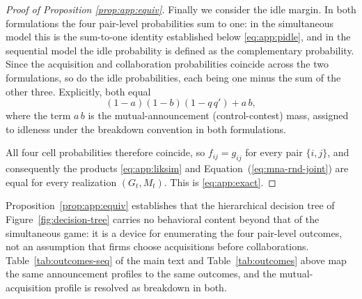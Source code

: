 \begin{proof}[Proof of Proposition \ref{prop:app:equiv}]
Finally we consider the idle margin. In both formulations the four pair-level
probabilities sum to one: in the simultaneous model this is the
sum-to-one identity established below \eqref{eq:app:pidle}, and in the
sequential model the idle probability is defined as the complementary
probability. Since the acquisition and collaboration probabilities
coincide across the two formulations, so do the idle probabilities, each
being one minus the sum of the other three. Explicitly, both equal
\[
  (1-a)(1-b)(1-q\,q') + a\,b,
\]
where the term $a\,b$ is the mutual-announcement (control-contest) mass,
assigned to idleness under the breakdown convention in both
formulations.

All four cell probabilities therefore coincide, so $f_{ij}=g_{ij}$ for
every pair $\{i,j\}$, and consequently the products \eqref{eq:app:liksim}
and Equation~(\ref{eq:mna-rnd-joint}) are equal for every realization
$(G_t,M_t)$. This is \eqref{eq:app:exact}.
\end{proof}
Proposition~\ref{prop:app:equiv} establishes that the hierarchical
decision tree of Figure~\ref{fig:decision-tree} carries no behavioral
content beyond that of the simultaneous game: it is a device for
enumerating the four pair-level outcomes, not an assumption that firms
choose acquisitions before collaborations. Table~\ref{tab:outcomes-seq}
of the main text and Table~\ref{tab:outcomes} above map the same
announcement profiles to the same outcomes, and the mutual-acquisition
profile is resolved as breakdown in both.

